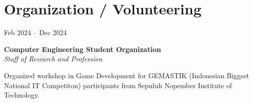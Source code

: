 \section{Organization / Volunteering}

\begin{twocolentry}{
     Feb 2024 – Dec 2024
}

\textbf{Computer Engineering Student Organization}\\
\textit{Staff of Research and Profession}
\end{twocolentry}

\vspace{0.10 cm}
\begin{onecolentry}
    \begin{highlights}
        \item Organized workshop in Game Development for GEMASTIK (Indonesian Biggest National IT Competiton) participants from Sepuluh Nopember Institute of Technology.
    \end{highlights}
\end{onecolentry}
